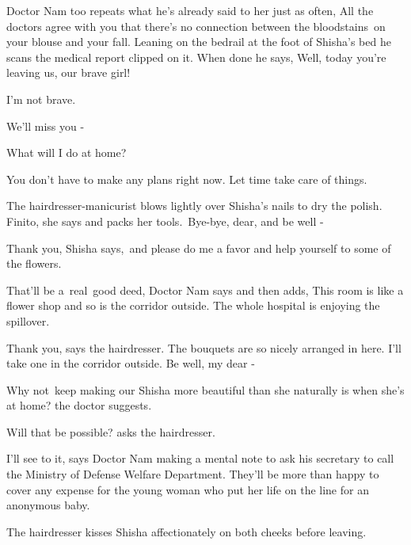 \documentclass[letterpaper]{article}
\begin{document}
Doctor Nam too repeats what he's already said to her just as often, {\textquotedbl}All the doctors agree with you that
there's no connection between the bloodstains~on your blouse and your fall.{\textquotedbl} Leaning on the bedrail at
the foot of Shisha's bed he scans the medical report clipped on it. When done he says, {\textquotedbl}Well, today
you're leaving us, our brave girl!{\textquotedbl} 

{\textquotedbl}I'm not brave.{\textquotedbl} 

{\textquotedbl}We'll miss you -{\textquotedbl} 

{\textquotedbl}What will I do at home?{\textquotedbl} 

{\textquotedbl}You don't have to make any plans right now. Let time take care of things.{\textquotedbl} 

The hairdresser-manicurist blows lightly over Shisha's nails to dry the polish. {\textquotedbl}Finito,{\textquotedbl}
she says and packs her tools.~{\textquotedbl}Bye-bye, dear, and be well -{\textquotedbl} ~

{\textquotedbl}Thank you,{\textquotedbl} Shisha says,~{\textquotedbl}and please do me a favor and help yourself to some
of the flowers.{\textquotedbl} 

{\textquotedbl}That'll be a\ real\ good deed,{\textquotedbl} Doctor Nam says and then adds, {\textquotedbl}This room is
like a flower shop and so is the corridor outside. The whole hospital is enjoying the spillover.{\textquotedbl}

{\textquotedbl}Thank you,{\textquotedbl} says the hairdresser. {\textquotedbl}The bouquets are so nicely arranged in
here. I'll take one in the corridor outside. Be well, my dear -{\textquotedbl} 

{\textquotedbl}Why not~keep making our Shisha more beautiful than she naturally is when she's at home?{\textquotedbl}
the doctor suggests. 

{\textquotedbl}Will that be possible?{\textquotedbl} asks the hairdresser. 

{\textquotedbl}I'll see to it,{\textquotedbl} says Doctor Nam making a mental note to ask his secretary to call the
Ministry of Defense Welfare Department. They'll be more than happy to cover any expense for the young woman who put her
life on the line for an anonymous baby.

The hairdresser kisses Shisha affectionately on both cheeks before leaving.
\end{document}
